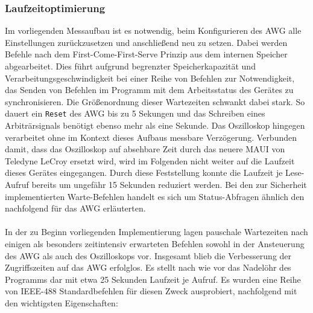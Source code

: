 \documentclass[../Report.tex]{subfiles}
\begin{document}
\subsubsection{Laufzeitoptimierung}
Im vorliegenden Messaufbau ist es notwendig, beim Konfigurieren des AWG alle Einstellungen zurückzusetzen und anschließend neu zu setzen. Dabei werden Befehle nach dem First-Come-First-Serve Prinzip aus dem internen Speicher abgearbeitet. Dies führt aufgrund begrenzter Speicherkapazität und Verarbeitungsgeschwindigkeit bei einer Reihe von Befehlen zur Notwendigkeit, das Senden von Befehlen im Programm mit dem Arbeitsstatus des Gerätes zu synchronisieren. 
Die Größenordnung dieser Wartezeiten schwankt dabei stark. So dauert ein \lstinline{Re}\lstinline{set} des AWG bis zu 5 Sekungen und das Schreiben eines Arbiträrsignals benötigt ebenso mehr als eine Sekunde. Das Oszilloskop hingegen verarbeitet ohne im Kontext dieses Aufbaus messbare Verzögerung. Verbunden damit, dass das Oszilloskop auf absehbare Zeit durch das neuere MAUI von Teledyne LeCroy ersetzt wird, wird im Folgenden nicht weiter auf die Laufzeit dieses Gerätes eingegangen. Durch diese Feststellung konnte die Laufzeit je Lese-Aufruf bereits um ungefähr 15 Sekunden reduziert werden.
Bei den zur Sicherheit implementierten Warte-Befehlen handelt es sich um Status-Abfragen ähnlich den nachfolgend für das AWG erläuterten.
\\
\\
\noindent
In der zu Beginn vorliegenden Implementierung lagen pauschale Wartezeiten nach einigen als besonders zeitintensiv erwarteten Befehlen sowohl in der Ansteuerung des AWG als auch des Oszilloskops vor. 
Insgesamt blieb die Verbesserung der Zugriffszeiten auf das AWG erfolglos. Es stellt nach wie vor das Nadelöhr des Programms dar mit etwa 25 Sekunden Laufzeit je Aufruf. 
Es wurden eine Reihe von IEEE-488 Standardbefehlen für diesen Zweck ausprobiert, nachfolgend mit den wichtigsten Eigenschaften:
\end{document}
